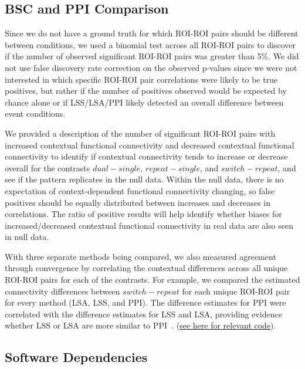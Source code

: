 \documentclass[phd,appendix,figures]{uithesis}
\begin{document}
\subsection*{BSC and PPI Comparison}

Since we do not have a ground truth for which ROI-ROI pairs should be different between conditions,
we used a binomial test across all ROI-ROI pairs to discover if the number of observed significant ROI-ROI pairs was greater
than 5\%.
We did not use false discovery rate correction on the observed p-values since we were not interested in
which specific ROI-ROI pair correlations were likely to be true positives, but rather if the number of positives
observed would be expected by chance alone or if LSS/LSA/PPI likely detected an overall difference between event conditions.

We provided a description of the number of significant ROI-ROI pairs with increased contextual functional connectivity and
decreased contextual functional connectivity to identify if contextual connectivity tends to increase or decrease overall
for the contrasts $dual - single$, $repeat - single$, and $switch - repeat$, and see if the pattern replicates
in the null data. 
Within the null data, there is no expectation of context-dependent functional connectivity changing, so false
positives should be equally distributed between increases and decreases in correlations.
The ratio of positive results will help identify whether biases for increased/decreased contextual functional connectivity
in real data are also seen in null data.

With three separate methods being compared, we also measured agreement through convergence by correlating the
contextual differences across all unique ROI-ROI pairs for each of the contrasts.
For example, we compared the estimated connectivity differences between $switch - repeat$ for each unique
ROI-ROI pair for every method (LSA, LSS, and PPI).
The difference estimates for PPI were correlated with the difference estimates for LSS and LSA, providing
evidence whether LSS or LSA are more similar to PPI~\cite{Steiger1980}.
(\href{https://github.com/jdkent/BetaSeriesRealDataAnalysis/blob/2e5d7d2443795133770383daaa401cf70cc03f29/PPITest/compare_bsc_ppi.ipynb}{see here for relevant code}).

\subsection*{Software Dependencies}
\label{methods:software-dependencies2}
\end{document}
